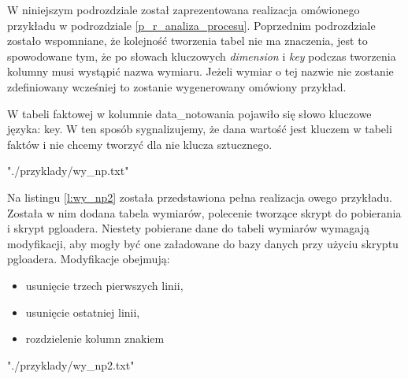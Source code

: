 W niniejszym podrozdziale został zaprezentowana realizacja omówionego przykładu w podrozdziale \ref{p_r_analiza_procesu}.
Poprzednim podrozdziale zostało wspomniane, że kolejność tworzenia tabel nie ma znaczenia,
 jest to spowodowane tym, że po słowach kluczowych  \textit{dimension} i  \textit{key} 
 podczas tworzenia kolumny musi wystąpić nazwa wymiaru. 
Jeżeli wymiar o tej nazwie nie zostanie zdefiniowany wcześniej to zostanie wygenerowany omówiony przykład.

W tabeli faktowej w kolumnie data\_notowania pojawiło się słowo kluczowe języka: key.
W ten sposób sygnalizujemy,
 że dana wartość jest kluczem w tabeli faktów
 i nie chcemy tworzyć dla nie klucza sztucznego. 

 {"./przyklady/wy_np.txt"}


Na listingu \ref{l:wy_np2} została przedstawiona pełna realizacja owego przykładu.
Została w nim dodana tabela wymiarów,
 polecenie tworzące skrypt do pobierania
 i skrypt pgloadera.
Niestety pobierane dane do tabeli wymiarów wymagają modyfikacji,
 aby mogły być one załadowane do bazy danych przy użyciu skryptu pgloadera.
 Modyfikacje obejmują: 
\begin{itemize}
 \item usunięcie trzech pierwszych linii,
 \item usunięcie ostatniej linii,
 \item rozdzielenie kolumn znakiem 
\end{itemize}


 {"./przyklady/wy_np2.txt"}
